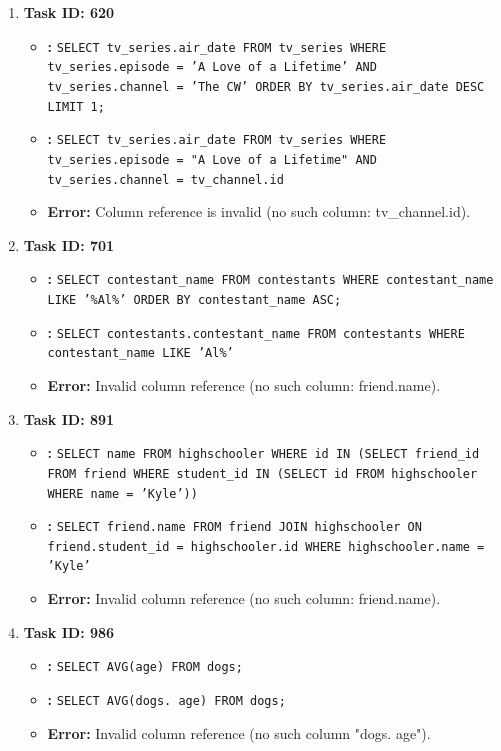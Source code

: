 \begin{enumerate}
    \item
    \textbf{Task ID: 620}
    \begin{itemize}
        \item \textbf{\Tool{}:} \texttt{SELECT tv\_series.air\_date FROM tv\_series WHERE tv\_series.episode = 'A Love of a Lifetime' AND tv\_series.channel = 'The CW' ORDER BY tv\_series.air\_date DESC LIMIT 1;}
        \item \textbf{\syncode{}:} \texttt{SELECT tv\_series.air\_date FROM tv\_series WHERE tv\_series.episode = "A Love of a Lifetime" AND tv\_series.channel = tv\_channel.id}
        \item \textbf{Error:} Column reference is invalid (no such column: tv\_channel.id).
    \end{itemize}

    \item
    \textbf{Task ID: 701}
    \begin{itemize}
        \item \textbf{\Tool{}:} \texttt{SELECT contestant\_name FROM contestants WHERE contestant\_name LIKE '\%Al\%' ORDER BY contestant\_name ASC;}
        \item \textbf{\syncode{}:} \texttt{SELECT contestants.contestant\_name FROM contestants WHERE contestant\_name LIKE 'Al\%'}
        \item \textbf{Error:} Invalid column reference (no such column: friend.name).
    \end{itemize}

    \item
    \textbf{Task ID: 891}
    \begin{itemize}
        \item \textbf{\Tool{}:} \texttt{SELECT name FROM highschooler WHERE id IN (SELECT friend\_id FROM friend WHERE student\_id IN (SELECT id FROM highschooler WHERE name = 'Kyle'))}
        \item \textbf{\syncode{}:} \texttt{SELECT friend.name FROM friend JOIN highschooler ON friend.student\_id = highschooler.id WHERE highschooler.name = 'Kyle'}
        \item \textbf{Error:} Invalid column reference (no such column: friend.name).
    \end{itemize}

    \item
    \textbf{Task ID: 986}
    \begin{itemize}
        \item \textbf{\Tool{}:} \texttt{SELECT AVG(age) FROM dogs;}
        \item \textbf{\syncode{}:} \texttt{SELECT AVG(dogs. age) FROM dogs;}
        \item \textbf{Error:} Invalid column reference (no such column "dogs. age").
    \end{itemize}


\end{enumerate}
